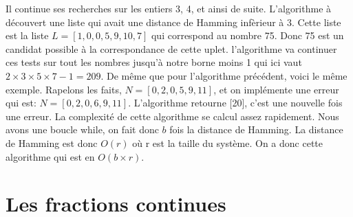\documentclass[a4paper, 11pt]{report}
\begin{document}
Il continue ses recherches sur les entiers 3, 4, et ainsi de suite. L'algorithme à découvert une liste qui avait une distance de Hamming infèrieur à 3. Cette liste est la liste $L=[1,0,0,5,9,10,7]$ qui correspond au nombre 75. Donc 75 est un candidat possible à la correspondance de cette uplet.
l'algorithme va continuer ces tests sur tout les nombres jusqu'à notre borne moins 1 qui ici vaut $2\times 3\times 5\times 7 -1=209$. \newline
\newline
De même que pour l'algorithme précédent, voici le même exemple. \newline
Rapelons les faits, $N=[0, 2, 0, 5, 9, 11]$, et on implémente une erreur qui est: $N=[0, 2, 0, 6, 9, 11]$.
L'algorithme retourne [20], c'est une nouvelle fois une erreur.
\newline
La complexité de cette algorithme se calcul assez rapidement. Nous avons une boucle while, on fait donc $b$ fois la distance de Hamming. La distance de Hamming est donc $O(r)$ où r est la taille du système. On a donc cette algorithme 
qui est en $O(b\times r)$.




\newpage
\chapter{Les fractions continues} 
\end{document}
